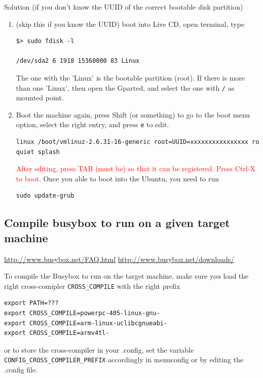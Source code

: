 Solution (if you don't know the UUID of the correct bootable disk partition)
\begin{enumerate}
  \item (skip this if you know the UUID) boot into Live CD, open terminal, type
\begin{verbatim}
$> sudo fdisk -l

/dev/sda2 6 1918 15360000 83 Linux
\end{verbatim}
The one with the 'Linux' is the bootable partition (root). If there is more than
one 'Linux', then open the Gparted, and select the one with \verb!/! as mounted
point.


  \item Boot the machine again, press Shift (or something) to go to the boot
  menu option, select the right entry, and press \verb!e! to edit.
\begin{verbatim}
linux /boot/vmlinuz-2.6.31-16-generic root=UUID=xxxxxxxxxxxxxxxx ro quiet splash
\end{verbatim}  
\textcolor{red}{After editing, press TAB (must be) so that it can be
registered. Press Ctrl-X to boot}. Once you able to boot into the Ubuntu, you
need to run

\begin{verbatim}
sudo update-grub
\end{verbatim}
\end{enumerate}


\subsection{Compile busybox to run on a given target machine}
\label{sec:busybox-compile-target-machine}

\url{http://www.busybox.net/FAQ.html}
\url{http://www.busybox.net/downloads/}

To compile the Busybox to run on the target machine, make sure you load the right 
cross-comipler \verb!CROSS_COMPILE! with the right prefix
\begin{verbatim}
export PATH=???
export CROSS_COMPILE=powerpc-405-linux-gnu-
export CROSS_COMPILE=arm-linux-uclibcgnueabi-
export CROSS_COMPILE=armv4tl-
\end{verbatim}
or to store the cross-compiler in your .config, set the variable
\verb!CONFIG_CROSS_COMPILER_PREFIX! accordingly in menuconfig or by editing the
.config file.

